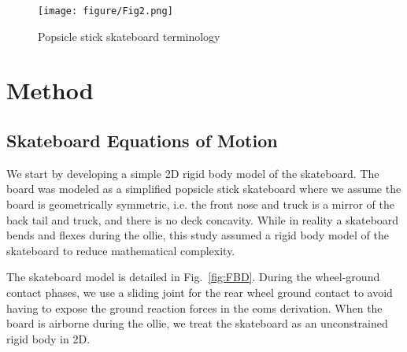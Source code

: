 \documentclass[default,iicol,pdflatex]{sn-jnl}
\begin{document}
\begin{figure}[t]
    \texttt{[image: figure/Fig2.png]}
    \caption[Skateboard terminology]{Popsicle stick skateboard terminology}
    \label{fig:skateboard terminology}
\end{figure}

\section{Method}

\subsection{Skateboard Equations of Motion}
We start by developing a simple 2D rigid body model of the skateboard.
The board was modeled as a simplified popsicle stick skateboard where we assume the board is geometrically symmetric, i.e. the front nose and truck is a mirror of the back tail and truck, and there is no deck concavity.
While in reality a skateboard bends and flexes during the ollie, this study assumed a rigid body model of the skateboard to reduce mathematical complexity.

The skateboard model is detailed in Fig.~\ref{fig:FBD}. During the wheel-ground contact phases, we use a sliding joint for the rear wheel ground contact to avoid having to expose the ground reaction forces in the \glspl{eom} derivation.
When the board is airborne during the ollie, we treat the skateboard as an unconstrained rigid body in 2D. 
\end{document}
